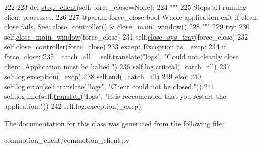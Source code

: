 \begin{DoxyCode}
222 
223     \textcolor{keyword}{def }\hyperlink{classcommotion__client_1_1commotion__client_1_1CommotionClientApplication_a63104a06ba20d9b679c22b542fd90c94}{stop\_client}(self, force\_close=None):
224         \textcolor{stringliteral}{"""}
225 \textcolor{stringliteral}{        Stops all running client processes.}
226 \textcolor{stringliteral}{}
227 \textcolor{stringliteral}{        @param force\_close bool Whole application exit if clean close fails. See: close\_controller() &
       close\_main\_window()}
228 \textcolor{stringliteral}{        """}
229         \textcolor{keywordflow}{try}:
230             self.\hyperlink{classcommotion__client_1_1commotion__client_1_1CommotionClientApplication_ac3f5efd893879314eb1fbcf7e4d90192}{close\_main\_window}(force\_close)
231             self.\hyperlink{classcommotion__client_1_1commotion__client_1_1CommotionClientApplication_a2a0f0cfc9ca6a62a2aaa90bdc8bca1fc}{close\_sys\_tray}(force\_close)
232             self.\hyperlink{classcommotion__client_1_1commotion__client_1_1CommotionClientApplication_aa35cc13c36cfa90d6ac3de6db56e5fc4}{close\_controller}(force\_close)
233         \textcolor{keywordflow}{except} Exception \textcolor{keyword}{as} \_excp:
234             \textcolor{keywordflow}{if} force\_close:
235                 \_catch\_all = self.\hyperlink{classcommotion__client_1_1commotion__client_1_1CommotionClientApplication_a57e951c9b241fb0e0c70055b4ca1b6f7}{translate}(\textcolor{stringliteral}{"logs"}, \textcolor{stringliteral}{"Could not cleanly close client. Application
       must be halted."})
236                 self.log.critical(\_catch\_all)
237                 self.log.exception(\_excp)
238                 self.\hyperlink{classcommotion__client_1_1commotion__client_1_1CommotionClientApplication_af2043aac2ebc25f55b73ec317d6ea463}{end}(\_catch\_all)
239             \textcolor{keywordflow}{else}:
240                 self.log.error(self.\hyperlink{classcommotion__client_1_1commotion__client_1_1CommotionClientApplication_a57e951c9b241fb0e0c70055b4ca1b6f7}{translate}(\textcolor{stringliteral}{"logs"}, \textcolor{stringliteral}{"Client could not be closed."}))
241                 self.log.info(self.\hyperlink{classcommotion__client_1_1commotion__client_1_1CommotionClientApplication_a57e951c9b241fb0e0c70055b4ca1b6f7}{translate}(\textcolor{stringliteral}{"logs"}, \textcolor{stringliteral}{"It is reccomended that you restart the
       application."}))
242                 self.log.exception(\_excp)

\end{DoxyCode}


The documentation for this class was generated from the following file\+:\begin{DoxyCompactItemize}
\item 
commotion\+\_\+client/commotion\+\_\+client.\+py\end{DoxyCompactItemize}
